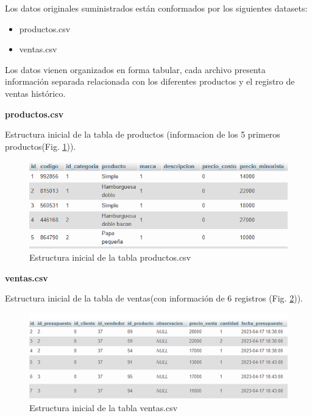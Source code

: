 Los datos originales suministrados están conformados por los siguientes
datasets:
\begin{itemize}
  \item productos.csv
  \item ventas.csv
\end{itemize}

Los datos vienen organizados en forma tabular, cada archivo presenta
información separada relacionada con los diferentes productos y el registro de
ventas histórico.

\vspace{1\baselineskip}
\textbf{productos.csv}

Estructura inicial de la tabla de productos (informacion de los 5 primeros
productos(Fig. \ref{fig:priemeros_5productos})).

\begin{figure}[H]
  \begin{center}
    \includegraphics[scale=0.90]{./tabla_producto.png}
    \caption{Estructura inicial de la tabla productos.csv}
    \label{fig:priemeros_5productos}
  \end{center}
\end{figure}

\textbf{ventas.csv}

Estructura inicial de la tabla de ventas(con información de 6 registros (Fig.
\ref{fig:ventas_original})).

\begin{figure}[H]
  \begin{center}
    \includegraphics[scale=0.90]{./ventas_tabla.png}
    \caption{Estructura inicial de la tabla  ventas.csv}
    \label{fig:ventas_original}
  \end{center}
\end{figure}

